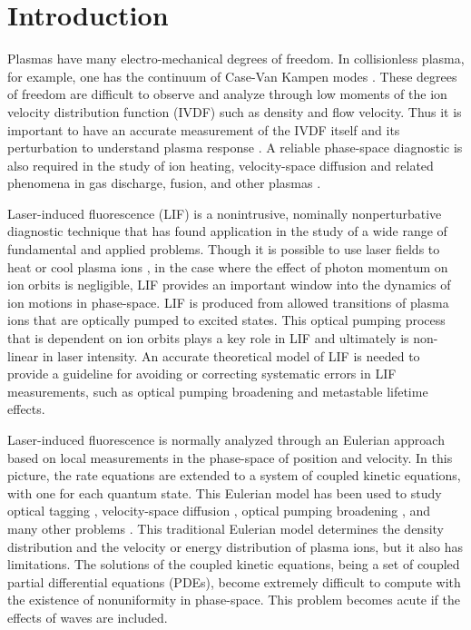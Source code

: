 \documentclass[aip,pop,reprint]{revtex4-1}
\begin{document}
\section{Introduction}
\label{sec:intro}

Plasmas have many electro-mechanical degrees of freedom. In collisionless plasma, for example, one has the continuum of Case-Van Kampen modes \cite{van_kampen_theory_1955, case_plasma_1959}. These degrees of freedom are difficult to observe and analyze through low moments of the ion velocity distribution function (IVDF) such as density and flow velocity. Thus it is important to have an accurate measurement of the IVDF itself and its perturbation to understand plasma response \cite{skiff_electrostatic_2002, skiff_linear_1998}. A reliable phase-space diagnostic is also required in the study of ion heating, velocity-space diffusion and related phenomena in gas discharge, fusion, and other plasmas \cite{anderegg_ion_1986, skiff_direct_1987, curry_measurement_1995}.

Laser-induced fluorescence (LIF) is a nonintrusive, nominally nonperturbative diagnostic technique that has found application in the study of a wide range of fundamental and applied problems. Though it is possible to use laser fields to heat or cool plasma ions \cite{hollmann_measurement_1999}, in the case where the effect of photon momentum on ion orbits is negligible, LIF provides an important window into the dynamics of ion motions in phase-space. LIF is produced from allowed transitions of plasma ions that are optically pumped to excited states. This optical pumping process that is dependent on ion orbits plays a key role in LIF and ultimately is non-linear in laser intensity. An accurate theoretical model of LIF is needed to provide a guideline for avoiding or correcting systematic errors in LIF measurements, such as optical pumping broadening \cite{goeckner_laserinduced_1989, goeckner_saturation_1993, severn_argon_1998} and metastable lifetime effects. 

Laser-induced fluorescence is normally analyzed through an Eulerian approach based on local measurements in the phase-space of position and velocity. In this picture, the rate equations are extended to a system of coupled kinetic equations, with one for each quantum state. This Eulerian model has been used to study optical tagging \cite{skiff_nonlinear_1995}, velocity-space diffusion \cite{curry_measurement_1995}, optical pumping broadening \cite{goeckner_laserinduced_1989}, and many other problems \cite{skiff_mini-conference_2004}. This traditional Eulerian model determines the density distribution and the velocity or energy distribution of plasma ions, but it also has limitations. The solutions of the coupled kinetic equations, being a set of coupled partial differential equations (PDEs), become extremely difficult to compute with the existence of nonuniformity in phase-space. This problem becomes acute if the effects of waves are included. 
\end{document}
